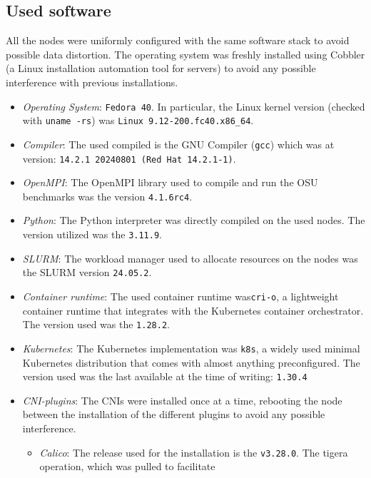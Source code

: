 \subsection{Used software}

All the nodes were uniformly configured with the same software stack to avoid
possible data distortion. The operating system was freshly installed using
Cobbler (a Linux installation automation tool for servers) to avoid any possible
interference with previous installations.

\begin{itemize}
  \itemsep0em
  \item \textit{Operating System}: \texttt{Fedora 40}. In particular, the Linux
    kernel version (checked with \texttt{uname -rs}) was \texttt{Linux
      9.12-200.fc40.x86\_64}.
  \item \textit{Compiler}: The used compiled is the GNU Compiler (\texttt{gcc})
    which was at version: \texttt{14.2.1 20240801 (Red Hat 14.2.1-1)}.
  \item \textit{OpenMPI}: The OpenMPI library used to compile and run the OSU
    benchmarks was the version \texttt{4.1.6rc4}.
  \item \textit{Python}: The Python interpreter was directly compiled on the
    used nodes. The version utilized was the \texttt{3.11.9}.
  \item \textit{SLURM}: The workload manager used to allocate resources on the
    nodes was the SLURM version \texttt{24.05.2}.
  \item \textit{Container runtime}: The used container runtime
    was\texttt{cri-o}, a lightweight container runtime that integrates with the
    Kubernetes container orchestrator. The version used was the \texttt{1.28.2}.
  \item \textit{Kubernetes}: The Kubernetes implementation was \texttt{k8s}, a
    widely used minimal Kubernetes distribution that comes with almost anything
    preconfigured. The version used was the last available at the time of
    writing: \texttt{1.30.4}
  \item \textit{CNI-plugins}: The CNIs were installed once at a time, rebooting
    the node between the installation of the different plugins to avoid any
    possible interference.
    \begin{itemize}
      \itemsep0em
      \item \textit{Calico}: The release used for the installation is the
        \texttt{v3.28.0}. The tigera operation, which was pulled to facilitate

\end{itemize}
\end{itemize}
